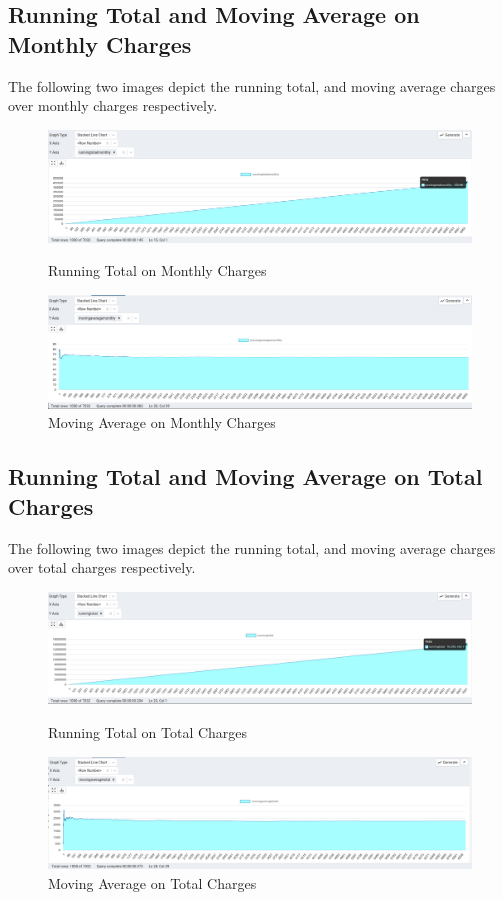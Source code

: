 \documentclass{article}
\theoremstyle{mytheoremstyle}
\theoremstyle{mytheoremstyle}
\theoremstyle{myproblemstyle}
\begin{document}
\subsection{Running Total and Moving Average on Monthly Charges}
The following two images depict the running total, and moving average charges over monthly charges respectively.

\begin{figure}[h]
    \centering
    \includegraphics[width=\textwidth]{running_total_monthly.png}
    \caption{Running Total on Monthly Charges}

    \includegraphics[width=\textwidth]{moving_average_monthly.png}
    \caption{Moving Average on Monthly Charges}
\end{figure}

\subsection{Running Total and Moving Average on Total Charges}
The following two images depict the running total, and moving average charges over total charges respectively.

\begin{figure}[h]
    \centering
    \includegraphics[width=\textwidth]{running_total.png}
    \caption{Running Total on Total Charges}

    \includegraphics[width=\textwidth]{moving_average_total.png}
    \caption{Moving Average on Total Charges}
\end{figure}
\end{document}
